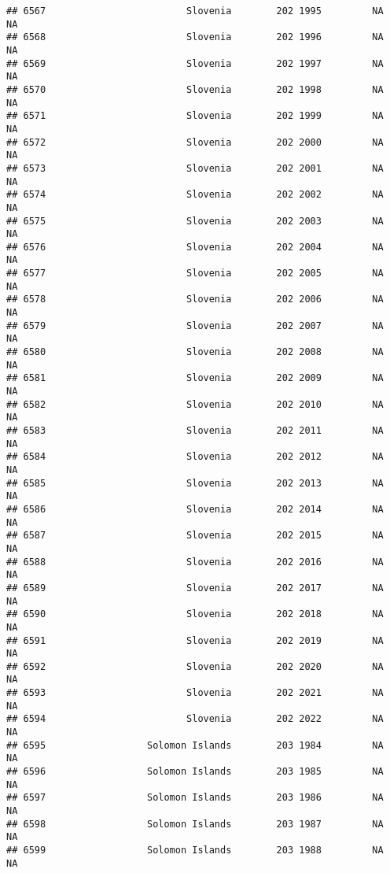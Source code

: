 \documentclass[
]{article}
\begin{document}
\begin{verbatim}
## 6567                         Slovenia        202 1995         NA         NA
## 6568                         Slovenia        202 1996         NA         NA
## 6569                         Slovenia        202 1997         NA         NA
## 6570                         Slovenia        202 1998         NA         NA
## 6571                         Slovenia        202 1999         NA         NA
## 6572                         Slovenia        202 2000         NA         NA
## 6573                         Slovenia        202 2001         NA         NA
## 6574                         Slovenia        202 2002         NA         NA
## 6575                         Slovenia        202 2003         NA         NA
## 6576                         Slovenia        202 2004         NA         NA
## 6577                         Slovenia        202 2005         NA         NA
## 6578                         Slovenia        202 2006         NA         NA
## 6579                         Slovenia        202 2007         NA         NA
## 6580                         Slovenia        202 2008         NA         NA
## 6581                         Slovenia        202 2009         NA         NA
## 6582                         Slovenia        202 2010         NA         NA
## 6583                         Slovenia        202 2011         NA         NA
## 6584                         Slovenia        202 2012         NA         NA
## 6585                         Slovenia        202 2013         NA         NA
## 6586                         Slovenia        202 2014         NA         NA
## 6587                         Slovenia        202 2015         NA         NA
## 6588                         Slovenia        202 2016         NA         NA
## 6589                         Slovenia        202 2017         NA         NA
## 6590                         Slovenia        202 2018         NA         NA
## 6591                         Slovenia        202 2019         NA         NA
## 6592                         Slovenia        202 2020         NA         NA
## 6593                         Slovenia        202 2021         NA         NA
## 6594                         Slovenia        202 2022         NA         NA
## 6595                  Solomon Islands        203 1984         NA         NA
## 6596                  Solomon Islands        203 1985         NA         NA
## 6597                  Solomon Islands        203 1986         NA         NA
## 6598                  Solomon Islands        203 1987         NA         NA
## 6599                  Solomon Islands        203 1988         NA         NA

\end{verbatim}
\end{document}
